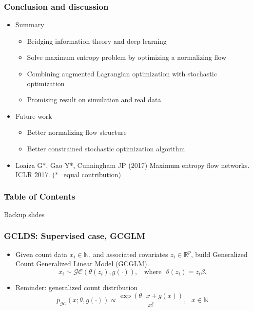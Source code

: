 \documentclass[16pt,presentation]{beamer}
\begin{document}
\begin{frame}
\frametitle{Conclusion and discussion}
\begin{itemize}
\item Summary
\begin{itemize}
\item Bridging information theory and deep learning
\item Solve maximum entropy problem by optimizing a normalizing flow
\item Combining augmented Lagrangian optimization with stochastic optimization
\item Promising result on simulation and real data
\end{itemize}
\item Future work
\begin{itemize}
\item Better normalizing flow structure
\item Better constrained stochastic optimization algorithm
\end{itemize}
\item Loaiza G*, \alert{Gao Y}*, Cunningham JP (2017) Maximum entropy flow networks. ICLR 2017. (*=equal contribution) 
\end{itemize}
\end{frame}



\begin{frame}
\frametitle{Table of Contents}
\tableofcontents
\end{frame}

\begin{frame}
\begin{center}
\Large{Backup slides}
\end{center}
\end{frame}

\begin{frame}
\frametitle{GCLDS: Supervised case, GCGLM}
\begin{itemize}
\item Given count data $x_i \in \mathbb{N}$, and associated covariates $z_i \in \mathbb{R}^p$, build Generalized Count Generalized Linear Model (GCGLM).
\[x_i \sim \mathcal{GC}(\theta(z_i), g(\cdot)), ~~~~\text{where} ~~~ \theta(z_i) =  z_i \beta.\]
\item Reminder: generalized count distribution
\[p_{\mathcal{GC}}(x; \theta, g(\cdot)) \propto \frac{\exp(\theta \cdot x + g(x) )}{x!}, ~~~x \in \mathbb{N}\]
\end{itemize}
\end{frame}
\end{document}
